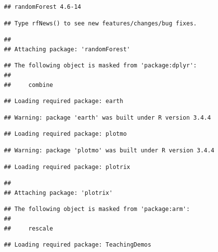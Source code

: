 \documentclass[]{article}
\begin{document}
\begin{verbatim}
## randomForest 4.6-14
\end{verbatim}

\begin{verbatim}
## Type rfNews() to see new features/changes/bug fixes.
\end{verbatim}

\begin{verbatim}
## 
## Attaching package: 'randomForest'
\end{verbatim}

\begin{verbatim}
## The following object is masked from 'package:dplyr':
## 
##     combine
\end{verbatim}

\begin{verbatim}
## Loading required package: earth
\end{verbatim}

\begin{verbatim}
## Warning: package 'earth' was built under R version 3.4.4
\end{verbatim}

\begin{verbatim}
## Loading required package: plotmo
\end{verbatim}

\begin{verbatim}
## Warning: package 'plotmo' was built under R version 3.4.4
\end{verbatim}

\begin{verbatim}
## Loading required package: plotrix
\end{verbatim}

\begin{verbatim}
## 
## Attaching package: 'plotrix'
\end{verbatim}

\begin{verbatim}
## The following object is masked from 'package:arm':
## 
##     rescale
\end{verbatim}

\begin{verbatim}
## Loading required package: TeachingDemos
\end{verbatim}
\end{document}
